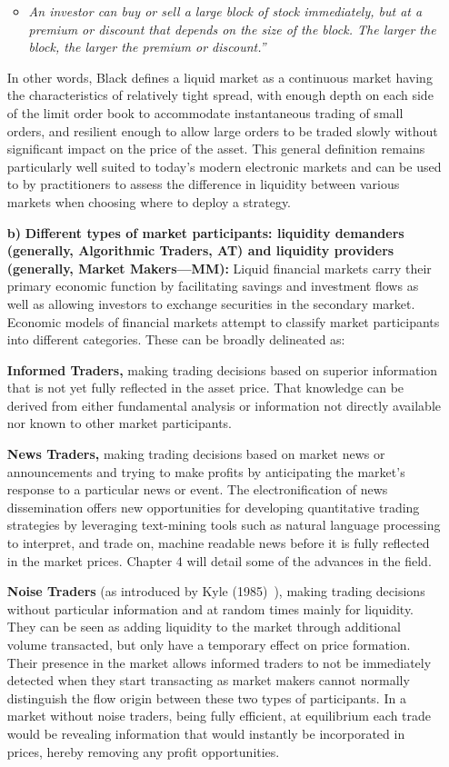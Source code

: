 \begin{enumerate}
\begin{itemize}
\item \textit{An investor can buy or sell a large block of stock immediately, but at a premium or discount that depends on the size of the block. The larger the block, the larger the premium or discount.''}
	\end{itemize}
In other words, Black defines a liquid market as a continuous market having the characteristics of relatively tight spread, with enough depth on each side of the limit order book to accommodate instantaneous trading of small orders, and resilient enough to allow large orders to be traded slowly without significant impact on the price of the asset. This general definition remains particularly well suited to today's modern electronic markets and can be used to by practitioners to assess the difference in liquidity between various markets when choosing where to deploy a strategy.

\item[\textbf{b)}] \textbf{Different types of market participants: liquidity demanders (generally, Algorithmic Traders, AT) and liquidity providers (generally, Market Makers---MM):}
Liquid financial markets carry their primary economic function by facilitating savings and investment flows as well as allowing investors to exchange securities in the secondary market. Economic models of financial markets attempt to classify market participants into different categories. These can be broadly delineated as: 

\textbf{Informed Traders,} making trading decisions based on superior information that is not yet fully reflected in the asset price. That knowledge can be derived from either fundamental analysis or information not directly available nor known to other market participants.

\textbf{News Traders,} making trading decisions based on market news or announcements and trying to make profits by anticipating the market's response to a particular news or event. The electronification of news dissemination offers new opportunities for developing quantitative trading strategies by leveraging text-mining tools such as natural language processing to interpret, and trade on, machine readable news before it is fully reflected in the market prices. Chapter 4 will detail some of the advances in the field.

\textbf{Noise Traders} (as introduced by Kyle (1985)~\cite{kyle1985}), making trading decisions without particular information and at random times mainly for liquidity. They can be seen as adding liquidity to the market through additional volume transacted, but only have a temporary effect on price formation. Their presence in the market allows informed traders to not be immediately detected when they start transacting as market makers cannot normally distinguish the flow origin between these two types of participants. In a market without noise traders, being fully efficient, at equilibrium each trade would be revealing information that would instantly be incorporated in prices, hereby removing any profit opportunities.


\end{enumerate}
